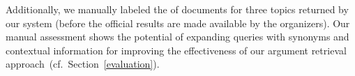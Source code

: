Additionally, we manually labeled the  of  documents for three topics returned by our system (before the official results are made available by the organizers). Our manual assessment shows the potential of expanding queries with synonyms and contextual information for improving the effectiveness of our argument retrieval approach~(cf.\ Section~\ref{evaluation}).




